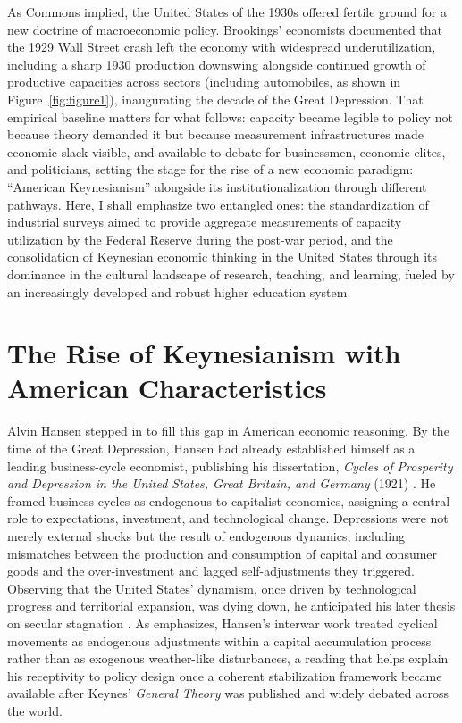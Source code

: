 \documentclass[11pt]{article}
\begin{document}
As Commons implied, the United States of the 1930s offered fertile ground for a new doctrine of macroeconomic policy. Brookings' economists documented that the 1929 Wall Street crash left the economy with widespread underutilization, including a sharp 1930 production downswing alongside continued growth of productive capacities across sectors (including automobiles, as shown in Figure~\ref{fig:figure1}), inaugurating the decade of the Great Depression. That empirical baseline matters for what follows: capacity became legible to policy not because theory demanded it but because measurement infrastructures made economic slack visible, and available to debate for businessmen, economic elites, and politicians, setting the stage for the rise of a new economic paradigm: ``American Keynesianism'' alongside its institutionalization through different pathways. Here, I shall emphasize two entangled ones: the standardization of industrial surveys aimed to provide aggregate measurements of capacity utilization by the Federal Reserve during the post-war period, and the consolidation of Keynesian economic thinking in the United States through its dominance in the cultural landscape of research, teaching, and learning, fueled by an increasingly developed and robust higher education system.

\section{The Rise of Keynesianism with American Characteristics}

Alvin Hansen stepped in to fill this gap in American economic reasoning. By the time of the Great Depression, Hansen had already established himself as a leading business-cycle economist, publishing his dissertation, \emph{Cycles of Prosperity and Depression in the United States, Great Britain, and Germany} (1921) \citep{hansen1921}. He framed business cycles as endogenous to capitalist economies, assigning a central role to expectations, investment, and technological change. Depressions were not merely external shocks but the result of endogenous dynamics, including mismatches between the production and consumption of capital and consumer goods and the over-investment and lagged self-adjustments they triggered. Observing that the United States' dynamism, once driven by technological progress and territorial expansion, was dying down, he anticipated his later thesis on secular stagnation \citep{hansen1938}. As \citet{barber1987} emphasizes, Hansen's interwar work treated cyclical movements as endogenous adjustments within a capital accumulation process rather than as exogenous weather-like disturbances, a reading that helps explain his receptivity to policy design once a coherent stabilization framework became available after Keynes' \emph{General Theory} was published and widely debated across the world.
\end{document}

